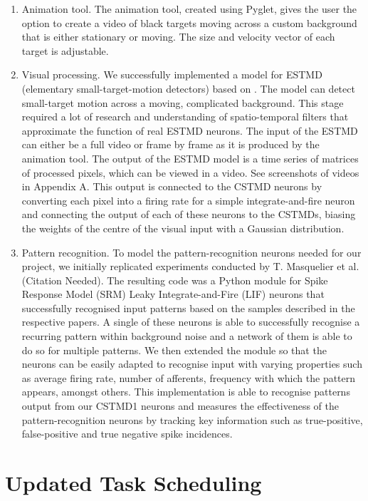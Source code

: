 \documentclass[a4paper,11pt]{article}
\begin{document}
\begin{enumerate}

	\item Animation tool. The animation tool, created using Pyglet, gives the user the option to create a video of black targets moving across a custom background that is either stationary or moving. The size and velocity vector of each target is adjustable.
	\item Visual processing. We successfully implemented a model for ESTMD (elementary small-target-motion detectors) based on \cite{hal11}. The model can detect small-target motion across a moving, complicated background. This stage required a lot of research and understanding of spatio-temporal filters that approximate the function of real ESTMD neurons. The input of the ESTMD can either be a full video or frame by frame as it is produced by the animation tool. The output of the ESTMD model is a time series of matrices of processed pixels, which can be viewed in a video. See screenshots of videos in Appendix A.
This output is connected to the CSTMD neurons by converting each pixel into a firing rate for a simple integrate-and-fire neuron and connecting the output of each of these neurons to the CSTMDs, biasing the weights of the centre of the visual input with a Gaussian distribution.
	\item Pattern recognition. To model the pattern-recognition neurons needed for our project, we initially replicated experiments conducted by T. Masquelier et al. (Citation Needed). The resulting code was a Python module for Spike Response Model (SRM) Leaky Integrate-and-Fire (LIF) neurons that successfully recognised input patterns based on the samples described in the respective papers. A single of these neurons is able to successfully recognise a recurring pattern within background noise and a network of them is able to do so for multiple patterns. We then extended the module so that the neurons can be easily adapted to recognise input with varying properties such as average firing rate, number of afferents, frequency with which the pattern appears, amongst others. This implementation is able to recognise patterns output from our CSTMD1 neurons and measures the effectiveness of the pattern-recognition neurons by tracking key information such as true-positive, false-positive and true negative spike incidences.
\end{enumerate}

\section{Updated Task Scheduling}	
\end{document}
